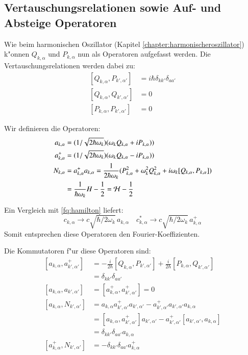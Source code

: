 \subsection{Vertauschungsrelationen sowie Auf- und Absteige Operatoren}
Wie beim harmonischen Oszillator (Kapitel \ref{chapter:harmonischeroszillator}) k"onnen $Q_{k,\alpha}$ und $P_{k,\alpha}$ nun als Operatoren aufgefasst werden. Die Vertauschungsrelationen werden dabei zu:
\begin{equation}
\begin{split}
[Q_{k,\alpha}, P_{k',\alpha'}] &= i \hbar \delta_{kk'}\delta_{aa'} \\
[Q_{k,\alpha}, Q_{k',\alpha'}] &= 0 \\
[P_{k,\alpha}, P_{k',\alpha'}] &= 0
\end{split}
\end{equation}

Wir definieren die Operatoren:
\begin{equation}
\begin{split}
a_{k,\alpha} &= (1/\sqrt{2 \hbar \omega_k})(\omega_k Q_{k,\alpha} + iP_{k,\alpha})) \\
a^+_{k,\alpha} &= (1/\sqrt{2 \hbar \omega_k})(\omega_k Q_{k,\alpha} - iP_{k,\alpha}))\\
N_{k,\alpha} &= a^+_{k,\alpha} a_{k,\alpha} = \frac{1}{2 \hbar \omega_k} (P_{k,\alpha}^2 + \omega_k^2 Q_{k,\alpha}^2 + i\omega_k [Q_{k,\alpha},P_{k,\alpha}] ) \\
 &= \frac{1}{ \hbar \omega_k } H - \frac{1}{2} = {\cal H} - \frac{1}{2}
\end{split}
\end{equation}

Ein Vergleich mit \ref{fq:hamilton} liefert:
\begin{equation} \label{fq:opp_fourier}
 c_{k,\alpha} \rightarrow c \sqrt{\hbar/2 \omega_k} \, a_{k,\alpha} \quad c^*_{k,\alpha} \rightarrow c \sqrt{\hbar/2 \omega_k} \, a^+_{k,\alpha}
\end{equation}
Somit entsprechen diese Operatoren den Fourier-Koeffizienten.

Die Kommutatoren f"ur diese Operatoren sind:
\begin{equation}
\begin{split}
[a_{k,\alpha} , a^+_{k',\alpha'}] &= - \frac{i}{2 \hbar} [Q_{k,\alpha}, P_{k',\alpha'}] + \frac{i}{2 \hbar} [P_{k,\alpha}, Q_{k',\alpha'}] \\
	 &= \delta_{kk'}\delta_{aa'} \\
[a_{k,\alpha} , a_{k',\alpha'}] &= [a^+_{k,\alpha} , a^+_{k',\alpha'}] = 0 \\
[a_{k,\alpha} , N_{k',\alpha'}] &= a_{k,\alpha} a^+_{k',\alpha'} a_{k',\alpha'} - a^+_{k',\alpha'} a_{k',\alpha'} a_{k,\alpha} \\
	&= [a_{k,\alpha} , a^+_{k',\alpha'}]a_{k',\alpha'} - a^+_{k',\alpha'}[a_{k',\alpha'} , a_{k,\alpha}]\\
	&= \delta_{kk'}\delta_{aa'} a_{k,\alpha} \\
[a^+_{k,\alpha} , N_{k',\alpha'}] &= -\delta_{kk'}\delta_{aa'} a^+_{k,\alpha}
\end{split}
\end{equation}

